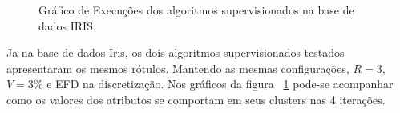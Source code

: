\begin{figure}[h!]
    \centering
    \quad
    
    \caption{Gráfico de Execuções dos algoritmos supervisionados na base de dados IRIS.} \label{fig:graf:IRIS_NB_CART}
        
\end{figure}

Ja na base de dados Iris, os dois algoritmos supervisionados testados apresentaram os mesmos rótulos. Mantendo as mesmas  configurações, ${R=3}$, ${V=3\%}$ e EFD na discretização. Nos gráficos da figura ~\ref{fig:graf:IRIS_NB_CART} pode-se acompanhar como os valores dos atributos se comportam em seus clusters nas 4 iterações.

